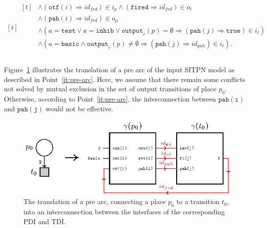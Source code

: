 \begin{definition}
\begin{enumerate}[resume]
\begin{equation*}
\begin{aligned}[t]
\begin{aligned}[t]
                                      & \land(\mathtt{otf}(i)\Rightarrow{}id_{frd})\in{}i_p\land(\mathtt{fired}\Rightarrow{}id_{frd})\in{}o_t \\
                                      & \land(\mathtt{pah}(i)\Rightarrow{}id_{frd})\in{}o_p \\
                                      & \land(a=\mathtt{test}\lor{}a=\mathtt{inhib}\lor{}\mathtt{output}_c(p)=\emptyset\Rightarrow(\mathtt{pah}(j)\Rightarrow\mathtt{true})\in{}i_t) \\
                                      & \land(a=\mathtt{basic}\land{}\mathtt{output}_c(p)\neq\emptyset\Rightarrow(\mathtt{pah}(j)\Rightarrow{}id_{pah})\in{}i_t). \\
                    \end{aligned} \\
      \end{aligned}
    \end{equation*}
  \end{enumerate}

  \bigskip
  
  Figure~\ref{fig:gen-pre-arc} illustrates the translation of a pre
  arc of the input SITPN model as described in Point~\ref{it:pre-arc}.
  Here, we assume that there remain some conflicts not solved by
  mutual exclusion in the set of output transitions of place
  $p_0$. Otherwise, according to Point~\ref{it:pre-arc}, the
  interconnection between $\mathtt{pah(i)}$ and $\mathtt{pah(j)}$
  would not be effective.
  
  \begin{figure}[h]
    \centering
    \includegraphics[keepaspectratio,width=.8\textwidth]{gen-pre-arc.eps}
    \caption{The translation of a pre arc, connecting a place $p_0$ to
      a transition $t_0$, into an interconnection between the
      interfaces of the corresponding PDI and TDI. }
    \label{fig:gen-pre-arc}
  \end{figure}


\end{definition}
